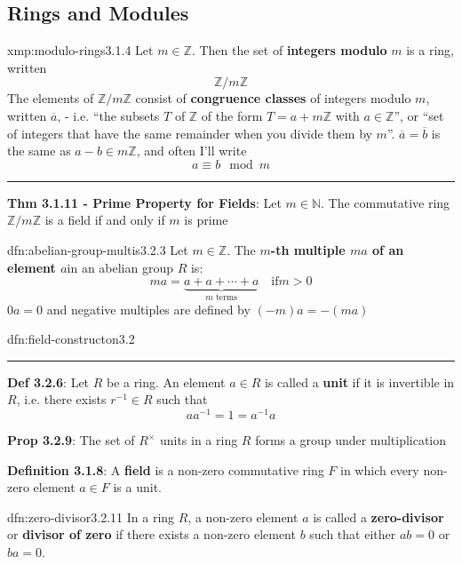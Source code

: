 \documentclass[landscape, 8pt]{extarticle}
\begin{document}
\begin{multicols}{3}
\section{Rings and Modules}

\begin{xmp}{xmp:modulo-rings}{3.1.4}
    Let $m\in \mathbb{Z}$. Then the set of \textbf{integers modulo} $m$ is a ring, written
    \[\mathbb{Z} / m\mathbb{Z}\]
     The elements of $\mathbb{Z} / m\mathbb{Z}$ consist of \textbf{congruence classes} of integers modulo $m$, written $\overline{a}$, - i.e. ``the subsets $T$ of $\mathbb{Z}$ of the form $T = a + m\mathbb{Z}$ with $a\in \mathbb{Z}$'', or ``set of integers that have the same remainder when you divide them by $m$''. $\overline{a} = \overline{b}$ is the same as $a-b\in m\mathbb{Z}$, and often I'll write
    \[a \equiv b \mod m\]

    \noindent\rule{\textwidth}{0.2pt}
    \textbf{Thm 3.1.11 - Prime Property for Fields}: Let $m\in\mathbb{N}$. The commutative ring $\mathbb{Z} / m\mathbb{Z}$ is a field if and only if $m$ is prime
\end{xmp}


\begin{dfn}{dfn:abelian-group-multis}{3.2.3}
    Let $m\in \mathbb{Z}$. The \textbf{$m$-th multiple $ma$ of an element $a$}in an abelian group $R$ is:
    \[ma = \underbrace{a + a + \cdots + a}_{\text{$m$ terms}} \quad \text{if} m > 0\]
    $0a = 0$ and negative multiples are defined by $(-m)a = -(ma)$
\end{dfn}


\begin{dfn}{dfn:field-constructon}{3.2}
    \noindent\rule{\textwidth}{0.2pt}
    \textbf{Def 3.2.6}: Let $R$ be a ring. An element $a\in R$ is called a \textbf{unit} if it is invertible in $R$, i.e. there exists $r^{-1}\in R$ such that
    \[a a^{-1} = 1 = a^{-1}a\]

    \textbf{Prop 3.2.9}: The set of $R^{\times}$ units in a ring $R$ forms a group under multiplication

    \textbf{Definition 3.1.8}: A \textbf{field} is a non-zero commutative ring $F$ in which every non-zero element $a\in F$ is a unit.
\end{dfn}


\begin{dfn}{dfn:zero-divisor}{3.2.11}
    In a ring $R$, a non-zero element $a$ is called a \textbf{zero-divisor} or \textbf{divisor of zero} if there exists a non-zero element $b$ such that either $ab = 0$ or $ba = 0$.
\end{dfn}


\end{multicols}
\end{document}
